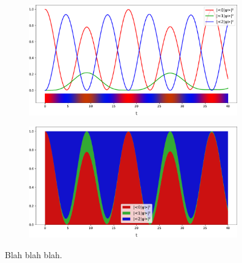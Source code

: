 \begin{figure}[h]
  \begin{subfigure}[b]{\textwidth}
    \centering
    \includegraphics[width=.8\textwidth]{img/3ldetect/hermitian3lines.pdf}
  \end{subfigure}
  \par\bigskip
  \par\bigskip
  \begin{subfigure}[b]{\textwidth}
    \centering
    \includegraphics[width=.8\textwidth]{img/3ldetect/hermitian3color.pdf}
  \end{subfigure}
  \par\bigskip
  \par\bigskip
  \caption{
    Blah blah blah.
  }
  \label{fig:aabsorbed-qubit-components_pwlattice}
\end{figure}



